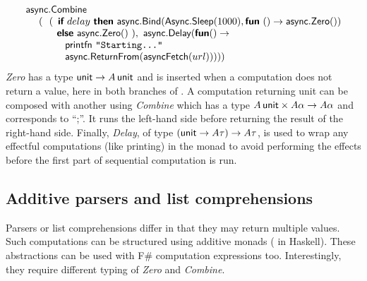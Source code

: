 \documentclass[runningheads,a4paper]{llncs}
\begin{document}
\begin{equation*}
\begin{array}{l}
\textnormal{\sffamily async}.\textnormal{\sffamily Combine} \\
\quad~(~~ (~\,\textnormal{\bfseries\sffamily if}~delay~\textnormal{\bfseries\sffamily then}~
   \textnormal{\sffamily async}.\textnormal{\sffamily Bind}(\textnormal{\sffamily Async}.\textnormal{\sffamily Sleep}(1000), \textnormal{\bfseries\sffamily fun}~() \rightarrow \textnormal{\sffamily async}.\textnormal{\sffamily Zero}())\\
\quad\quad ~~~\,\textnormal{\bfseries\sffamily else}~\textnormal{\sffamily async}.\textnormal{\sffamily Zero}()~),~ \textnormal{\sffamily async}.\textnormal{\sffamily Delay}(\textnormal{\bfseries\sffamily fun} () \rightarrow\\
\quad\quad\quad\quad \textnormal{\sffamily printfn}~\texttt{"Starting..."}\\
\quad\quad\quad\quad \textnormal{\sffamily async}.\textnormal{\sffamily ReturnFrom}(\textnormal{\sffamily asyncFetch}(url))) ))
\end{array}
\end{equation*}
%
\emph{Zero} has a type $\textnormal{\sffamily unit} \rightarrow A\,\textnormal{\sffamily unit}$ and is inserted
when a computation does not return a value, here in both branches of . 
A computation returning unit can be composed with another using \emph{Combine} which
has a type $A\,\textnormal{\sffamily unit} \times A\alpha \rightarrow A\alpha$ and corresponds to
``;''. It runs the left-hand side before returning the result of the right-hand side.
Finally, \emph{Delay}, of type $(\textnormal{\sffamily unit} \rightarrow A\tau) \rightarrow A\tau$, is
used to wrap any effectful computations (like printing) in the monad to avoid performing
the effects before the first part of sequential computation is run.


\subsection{Additive parsers and list comprehensions}
\label{sec:intro-seq-parsers}

Parsers or list comprehensions differ in that they may return multiple values.
Such computations can be structured using additive monads ( in 
Haskell). These abstractions can be used with F\# computation expressions too. Interestingly, they 
require different typing of \emph{Zero} and \emph{Combine}. 

\vspace{-1em}
\end{document}
